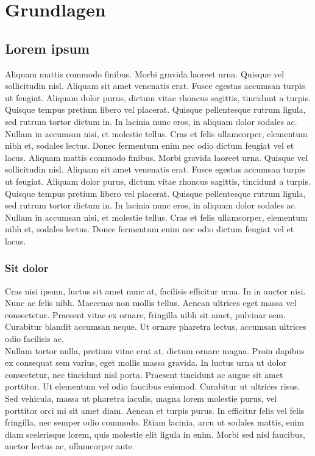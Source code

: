 \section{Grundlagen}

\subsection{Lorem ipsum}
Aliquam mattis commodo finibus. Morbi gravida laoreet urna. Quisque vel sollicitudin nisl. Aliquam sit amet venenatis erat. Fusce egestas accumsan turpis ut feugiat. Aliquam dolor purus, dictum vitae rhoncus sagittis, tincidunt a turpis. Quisque tempus pretium libero vel placerat. Quisque pellentesque rutrum ligula, sed rutrum tortor dictum in. In lacinia nunc eros, in aliquam dolor sodales ac. Nullam in accumsan nisi, et molestie tellus. Cras et felis ullamcorper, elementum nibh et, sodales lectus. Donec fermentum enim nec odio dictum feugiat vel et lacus. Aliquam mattis commodo finibus. Morbi gravida laoreet urna. Quisque vel sollicitudin nisl. Aliquam sit amet venenatis erat. Fusce egestas accumsan turpis ut feugiat. Aliquam dolor purus, dictum vitae rhoncus sagittis, tincidunt a turpis. Quisque tempus pretium libero vel placerat. Quisque pellentesque rutrum ligula, sed rutrum tortor dictum in. In lacinia nunc eros, in aliquam dolor sodales ac. Nullam in accumsan nisi, et molestie tellus. Cras et felis ullamcorper, elementum nibh et, sodales lectus. Donec fermentum enim nec odio dictum feugiat vel et lacus.

\subsubsection{Sit dolor}
Cras nisi ipsum, luctus sit amet nunc at, facilisis efficitur urna. In in auctor nisi. Nunc ac felis nibh. Maecenas non mollis tellus. Aenean ultrices eget massa vel consectetur. Praesent vitae ex ornare, fringilla nibh sit amet, pulvinar sem. Curabitur blandit accumsan neque. Ut ornare pharetra lectus, accumsan ultrices odio facilisis ac.\\
Nullam tortor nulla, pretium vitae erat at, dictum ornare magna. Proin dapibus ex consequat sem varius, eget mollis massa gravida. In luctus urna ut dolor consectetur, nec tincidunt nisl porta. Praesent tincidunt ac augue sit amet porttitor. Ut elementum vel odio faucibus euismod. Curabitur ut ultrices risus. Sed vehicula, massa ut pharetra iaculis, magna lorem molestie purus, vel porttitor orci mi sit amet diam. Aenean et turpis purus. In efficitur felis vel felis fringilla, nec semper odio commodo. Etiam lacinia, arcu ut sodales mattis, enim diam scelerisque lorem, quis molestie elit ligula in enim. Morbi sed nisl faucibus, auctor lectus ac, ullamcorper ante.